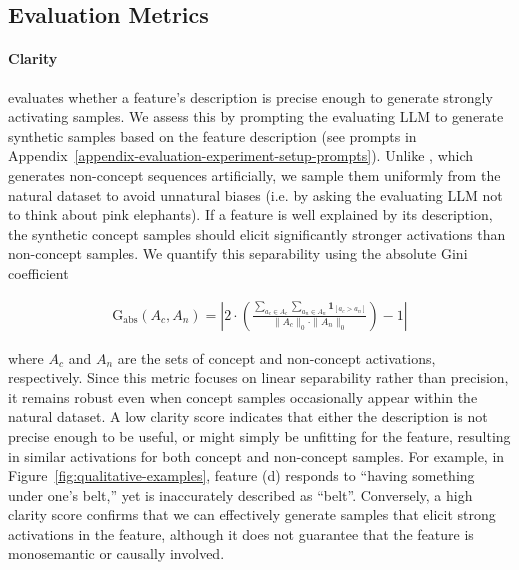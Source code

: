 \subsection{Evaluation Metrics}


\paragraph{Clarity} evaluates whether a feature’s description is precise enough to generate strongly activating samples. We assess this by prompting the evaluating LLM to generate synthetic samples based on the feature description (see prompts in Appendix~\ref{appendix-evaluation-experiment-setup-prompts}). Unlike \citet{gurarieh2025enhancingautomatedinterpretabilityoutputcentric}, which generates non-concept sequences artificially, we sample them uniformly from the natural dataset to avoid unnatural biases (i.e. by asking the evaluating LLM not to think about pink elephants). If a feature is well explained by its description, the synthetic concept samples should elicit significantly stronger activations than non-concept samples. We quantify this separability using the absolute Gini coefficient

{\scriptsize
    \begin{align}
    \mathrm{G_{abs}}(A_{c}, A_{n}) = \left| 2 \cdot \left( \frac{\sum\limits_{a_c \in A_c} \sum\limits_{a_n \in A_n} \mathbf{1}_{[a_c > a_n]}}{\| A_c \|_0 \cdot \| A_n \|_0} \right) -1 \right|
   \end{align}
}

where $A_c$ and $A_n$ are the sets of concept and non-concept activations, respectively. Since this metric focuses on linear separability rather than precision, it remains robust even when concept samples occasionally appear within the natural dataset. A low clarity score indicates that either the description is not precise enough to be useful, or might simply be unfitting for the feature, resulting in similar activations for both concept and non-concept samples. For example, in Figure~\ref{fig:qualitative-examples}, feature (d) responds to ``having something under one’s belt,'' yet is inaccurately described as ``belt''. Conversely, a high clarity score confirms that we can effectively generate samples that elicit strong activations in the feature, although it does not guarantee that the feature is monosemantic or causally involved.

